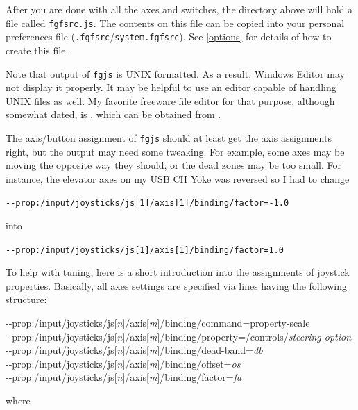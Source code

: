 After you are done with all the axes and switches, the directory above will hold a file called \texttt{fgfsrc.js}. The contents on this file can be copied into your personal preferences file
 (\texttt{.fgfsrc}/\texttt{system.fgfsrc}). See \ref{options} for details of how to create this file.

Note that output of \texttt{fgjs} is UNIX formatted. As a result, Windows Editor
may not display it properly. It may be helpful to use an editor capable of
handling UNIX files as well. My favorite freeware file editor for that purpose,
although somewhat dated, is , which can be obtained from .

The axis/button assignment of \texttt{fgjs} should at least get the axis assignments
right, but the output may need some tweaking. For example, some axes may be moving
the opposite way they should, or the dead zones may be too small. For instance,
the elevator axes on my USB CH Yoke was reversed so I had to change

\medskip
\noindent
\texttt{-$ $-prop:/input/joysticks/js[1]/axis[1]/binding/factor=-1.0}

\medskip
into

\medskip
\noindent
\texttt{-$ $-prop:/input/joysticks/js[1]/axis[1]/binding/factor=1.0}

\medskip
To help with tuning, here is a short introduction into the assignments of joystick properties.
Basically, all axes settings are specified via lines having the following structure:
 \medskip

\begin{ttfamily}
\tiny
\noindent
-$ $-prop:/input/joysticks/js[\textit{n}]/axis[\textit{m}]/binding/command=property-scale\\
-$ $-prop:/input/joysticks/js[\textit{n}]/axis[\textit{m}]/binding/property=/controls/\textit{steering option}\\
-$ $-prop:/input/joysticks/js[\textit{n}]/axis[\textit{m}]/binding/dead-band=\textit{db}\\
-$ $-prop:/input/joysticks/js[\textit{n}]/axis[\textit{m}]/binding/offset=\textit{os}\\
-$ $-prop:/input/joysticks/js[\textit{n}]/axis[\textit{m}]/binding/factor=\textit{fa}\\
\end{ttfamily}

\medskip

\noindent
where
\medskip

